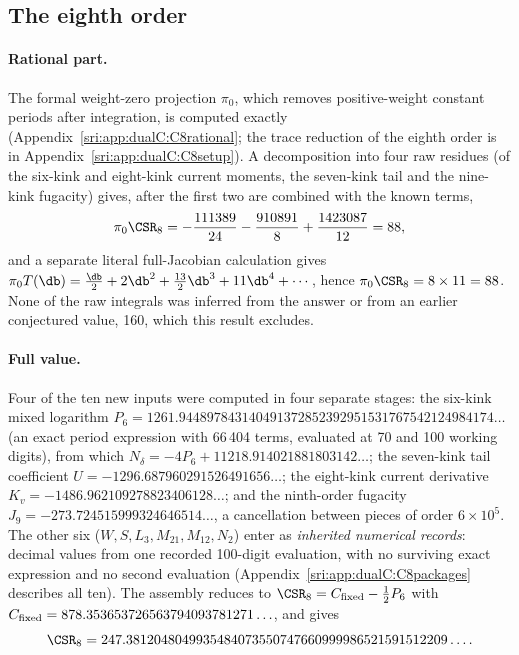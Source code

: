\subsection{The eighth order}\label{sri:sec:C8}
\paragraph{Rational part.} The formal weight-zero projection $\pi_0$, which removes positive-weight constant periods
after integration, is computed exactly (Appendix~\ref{sri:app:dualC:C8rational}; the trace reduction of the eighth order
is in Appendix~\ref{sri:app:dualC:C8setup}). A decomposition into four raw residues (of the six-kink and eight-kink current
moments, the seven-kink tail and the nine-kink fugacity) gives, after the first two are combined with the known terms,
\begin{equation}
 \pi_0\CSR_8=-\frac{111389}{24}-\frac{910891}{8}+\frac{1423087}{12}=88,
\end{equation}
and a separate literal full-Jacobian calculation gives $\pi_0T(\db)=\frac{\db}2+2\db^2+\frac{13}2\db^3+11\db^4+\cdots$,
hence $\pi_0\CSR_8=8\times11=88$. None of the raw integrals was inferred from the answer or from an earlier
conjectured value, 160, which this result excludes.

\paragraph{Full value.} Four of the ten new inputs were computed in four separate stages: the six-kink mixed logarithm
$P_6=1261.944897843140491372852392951531767542124984174\ldots$ (an exact period expression with 66\,404 terms,
evaluated at 70 and 100 working digits), from which $N_\delta=-4P_6+11218.914021881803142\ldots$; the seven-kink
tail coefficient $U=-1296.687960291526491656\ldots$; the eight-kink current derivative
$K_v=-1486.962109278823406128\ldots$; and the ninth-order fugacity $J_9=-273.724515999324646514\ldots$, a
cancellation between pieces of order $6\times10^5$. The other six ($W,S,L_3,M_{21},M_{12},N_2$) enter as
\emph{inherited numerical records}: decimal values from one recorded 100-digit evaluation, with no surviving exact
expression and no second evaluation (Appendix~\ref{sri:app:dualC:C8packages} describes all ten). The assembly reduces to $\CSR_8=C_{\rm fixed}-\frac12P_6$ with
$C_{\rm fixed}=878.353653726563794093781271\ldots$, and gives
\begin{equation}
 \CSR_8=247.3812048049935484073550747660999986521591512209\ldots .
 \label{sri:eq:C8num}
\end{equation}

